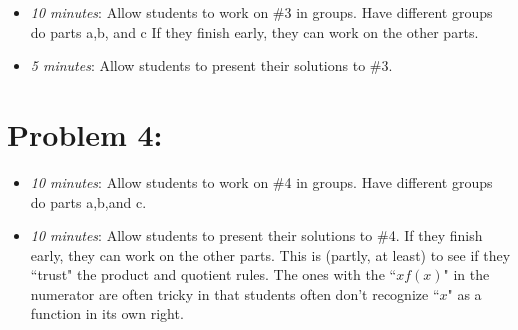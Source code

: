 \documentclass[handout,nooutcomes]{ximera}
\begin{document}
	\begin{itemize}
	
	\item  \emph{10 minutes}:  Allow students to work on \#3 in groups.  Have different groups do parts a,b, and c  If they finish early, they can work on the other parts.
	
	\item  \emph{5 minutes}:  Allow students to present their solutions to \#3.
	
	\end{itemize}
	


\section*{Problem 4:}

	\begin{itemize}
	
	\item  \emph{10 minutes}:  Allow students to work on \#4 in groups.  Have different groups do parts a,b,and c.
		
	\item  \emph{10 minutes}:  Allow students to present their solutions to \#4.  If they finish early, they can work on the other parts.  This is (partly, at least) to see if they ``trust" the product and quotient rules.  The ones with the ``$xf(x)$" in the numerator are often tricky in that students often don't recognize ``$x$" as a function in its own right. 	
	\end{itemize}	
	
	
	

	
	

	
	
	

	
	
	
\end{document}
